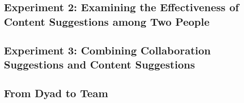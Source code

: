 \subsection{Experiment 2: Examining the Effectiveness of Content Suggestions among Two People}
\label{sec:exp2}

\subsection{Experiment 3: Combining Collaboration Suggestions and Content Suggestions}
\label{sec:exp3}


\subsection{From Dyad to Team}
\label{sec:exp4}